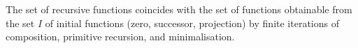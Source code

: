 The set of recursive functions coincides with the set of functions obtainable from the set $I$ of initial functions (zero, successor, projection) by finite iterations of composition, primitive recursion, and minimalisation.
